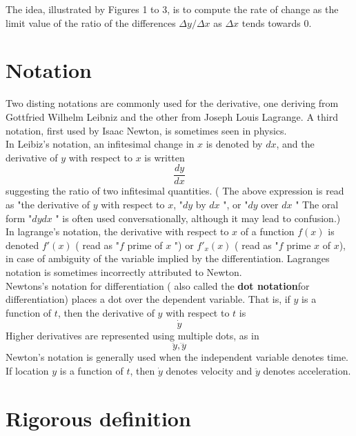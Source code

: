 The idea, illustrated by Figures 1 to 3, is to compute the rate of change as the limit value of the ratio of the differences $\Delta y / \Delta x$ as $\Delta x$ tends towards 0.

\section{Notation} Two disting notations are commonly used for the derivative, one deriving from Gottfried Wilhelm Leibniz and the other from Joseph Louis Lagrange. A third notation, first used by Isaac Newton, is sometimes seen in physics.\\

In Leibiz's notation, an infitesimal change in $x$ is denoted by $dx$, and the derivative of $y$ with respect to $x$ is written 
\[ 
\frac{dy}{dx}
\]
suggesting the ratio of two infitesimal quantities. ( The above expression is read as "the derivative of $y$ with respect to $ x$, "$dy$ by $dx$ ", or "$dy$ over $dx$ " The oral form "$dy dx$ " is often used conversationally, although it may lead to confusion.)\\

In lagrange's notation, the derivative with respect to $x$ of a function $f(x)$  is denoted $f'(x)$ ( read as "$f$ prime of $x$ ") or $f'_x(x)$ ( read as "$f$ prime $x$ of $x$), in case of ambiguity of the variable implied by the differentiation. Lagranges notation is sometimes incorrectly attributed to Newton.\\

Newtons's notation for differentiation ( also called the \textbf{ dot notation}for differentiation) places a dot over the dependent variable. That is, if $y$ is a function of $t$, then the derivative of $y$ with respect to $t$ is
\[ 
	\dot{y}
\]
Higher derivatives are represented using multiple dots, as in
\[ 
	\ddot{y}, \dddot{y}
\]
Newton's notation is generally used when the independent variable denotes time. If location $y$ is a function of $t$, then $\dot{y}$ denotes velocity and $\ddot{y}$ denotes acceleration.\\


\section{Rigorous definition}

